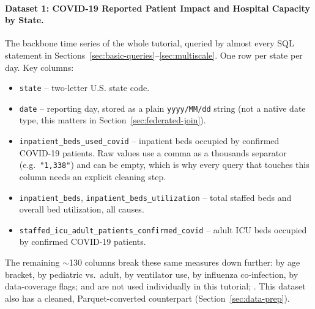 \documentclass[11pt,a4paper]{article}
\begin{document}
\paragraph{Dataset 1: COVID-19 Reported Patient Impact and Hospital Capacity by State.}
The backbone time series of the whole tutorial, queried by almost every SQL statement
in Sections~\ref{sec:basic-queries}--\ref{sec:multiscale}. One row per state per day.
Key columns:
\begin{itemize}[leftmargin=1.6em]
  \item \texttt{state} -- two-letter U.S. state code.
  \item \texttt{date} -- reporting day, stored as a plain \texttt{yyyy/MM/dd} string
    (not a native date type, this matters in Section~\ref{sec:federated-join}).
  \item \texttt{inpatient\_beds\_used\_covid} -- inpatient beds occupied by confirmed
    COVID-19 patients. Raw values use a comma as a thousands separator (e.g.\
    \texttt{"1,338"}) and can be empty, which is why every query that touches this
    column needs an explicit cleaning step.
  \item \texttt{inpatient\_beds}, \texttt{inpatient\_beds\_utilization} -- total
    staffed beds and overall bed utilization, all causes.
  \item \texttt{staffed\_icu\_adult\_patients\_confirmed\_covid} -- adult ICU beds
    occupied by confirmed COVID-19 patients.
\end{itemize}
The remaining $\sim$130 columns break these same measures down further: by age
bracket, by pediatric vs.\ adult, by ventilator use, by influenza co-infection, by
data-coverage flags; and are not used individually in this tutorial;
. This dataset also has a
cleaned, Parquet-converted counterpart (Section~\ref{sec:data-prep}).
\end{document}
